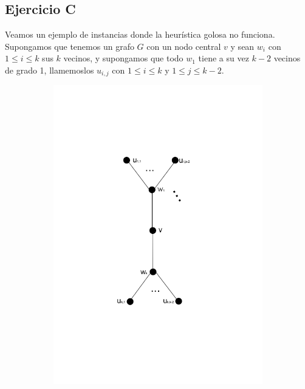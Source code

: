 \subsection{Ejercicio C}

Veamos un ejemplo de instancias donde la heurística golosa no funciona. Supongamos que tenemos un grafo $G$ con un nodo central $v$ y sean $w_i$ con $1 \leq i \leq k$ sus $k$ vecinos, y supongamos que todo $w_1$ tiene a su vez $k-2$ vecinos de grado 1, llamemoslos $u_{i,j}$ con $1 \leq i \leq k$ y $1 \leq j \leq k-2$. \\ 

\begin{figure}[H]
\centering
\begin{subfigure}[b]{0.5\textwidth}
                \includegraphics[width=\textwidth]{imagenes/grafos-ej3-tp3-1.png}
                \caption{}
        \end{subfigure}%
\end{figure}



